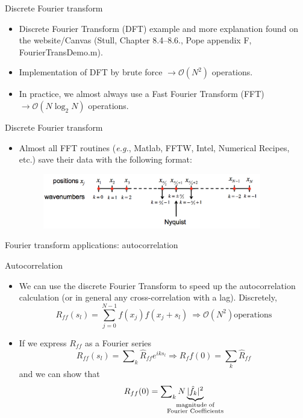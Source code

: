 \begin{frame}{Discrete Fourier transform}

\begin{itemize}
	\item Discrete Fourier Transform (DFT) example and more explanation found on the website/Canvas (Stull, Chapter 8.4--8.6., Pope appendix F, FourierTransDemo.m).
	\item Implementation of DFT by brute force $\rightarrow \mathcal{O}(N^2)$ operations.
	\item In practice, we almost always use a Fast Fourier Transform (FFT) $\rightarrow \mathcal{O}(N\log_2 N)$ operations.
\end{itemize}
\end{frame}

\begin{frame}{Discrete Fourier transform}

\begin{itemize}
	\item Almost all FFT routines (\textit{e.g.}, Matlab, FFTW, Intel, Numerical Recipes, etc.) save their data with the following format:
	\begin{figure}
		\includegraphics[width=0.9\textwidth]{discrete2.png}	
	\end{figure}
\end{itemize}
\end{frame}

\begin{frame}{Fourier transform applications: autocorrelation}

Autocorrelation
\begin{itemize}
	\item We can use the discrete Fourier Transform to speed up the autocorrelation calculation (or in general any cross-correlation with a lag). Discretely,$$R_{ff} (s_l) = \sum^{N-1}_{j=0} f(x_j) f(x_j + s_l)\ \Rightarrow \mathcal{O}(N^2) \text{operations}$$
	\item If we express $R_{ff}$ as a Fourier series$$R_{ff}(s_l) = \sum\nolimits_{k}  \hat R_{ff} e^{iks_l} \Rightarrow R_ff(0) = \sum_k \hat R_{ff}$$
	and we can show that $$R_{ff}(0) = \sum\nolimits_{k}  N\underbrace{|\hat f_k|^2}_{\mathclap{\substack{\text{magnitude of}\\\text{Fourier Coefficients}} }}$$
\end{itemize}

\end{frame}

